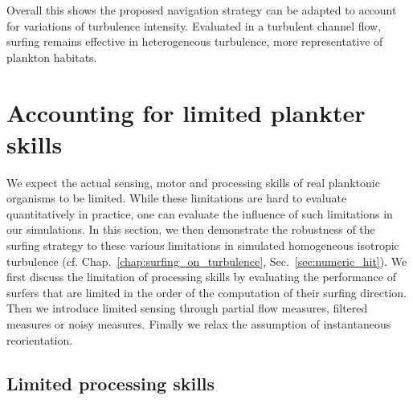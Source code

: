 Overall this shows the proposed navigation strategy can be adapted to account for variations of turbulence intensity.
Evaluated in a turbulent channel flow, surfing remains effective in heterogeneous turbulence, more representative of plankton habitats.

\section{Accounting for limited plankter skills}\label{sec:plankter_limitations}

We expect the actual sensing, motor and processing skills of real planktonic organisms to be limited.
While these limitations are hard to evaluate quantitatively in practice, one can evaluate the influence of such limitations in our simulations.
In this section, we then demonstrate the robustness of the surfing strategy to these various limitations in simulated homogeneous isotropic turbulence (cf. Chap.~\ref{chap:surfing_on_turbulence}, Sec.~\ref{sec:numeric_hit}).
We first discuss the limitation of processing skills by evaluating the performance of surfers that are limited in the order of the computation of their surfing direction.
Then we introduce limited sensing through partial flow measures, filtered measures or noisy measures.
Finally we relax the assumption of instantaneous reorientation.

\subsection{Limited processing skills}\label{sec:computational_power}

